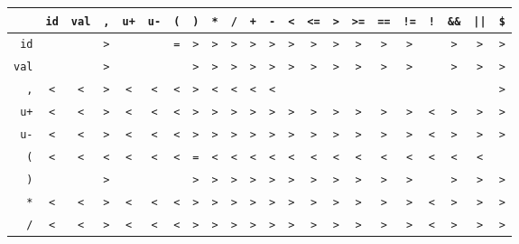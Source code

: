 \documentclass[11pt,a4paper]{article}
\newcommand*\id[1]{\texttt{#1}}
\begin{document}
  \begin{table}[H]
    \centering
    \begin{tabular}{|r||c|c|c|c|c|c|c|c|c|c|c|c|c|c|c|c|c|c|c|c|c|}
      \hline
               & \id{id} & \id{val} & \id{,} & \id{u+} & \id{u-} & \id{(} & \id{)} & \id{*} & \id{/} & \id{+} & \id{-} & \id{<} & \id{<=} & \id{>} & \id{>=} & \id{==} & \id{!=} & \id{!} & \id{\&\&} & \id{||} & \id{\$} \\ \hline
      \hline
      \id{id}  & \id{ }  & \id{ }   & \id{>} & \id{ }  & \id{ }  & \id{=} & \id{>} & \id{>} & \id{>} & \id{>} & \id{>} & \id{>} & \id{>}  & \id{>} & \id{>}  & \id{>}  & \id{>}  & \id{ } & \id{>} & \id{>} & \id{>}  \\ \hline
      \id{val} & \id{ }  & \id{ }   & \id{>} & \id{ }  & \id{ }  & \id{ } & \id{>} & \id{>} & \id{>} & \id{>} & \id{>} & \id{>} & \id{>}  & \id{>} & \id{>}  & \id{>}  & \id{>}  & \id{ } & \id{>} & \id{>} & \id{>}  \\ \hline
      \id{,}   & \id{<}  & \id{<}   & \id{>} & \id{<}  & \id{<}  & \id{<} & \id{>} & \id{<} & \id{<} & \id{<} & \id{<} & \id{ } & \id{ }  & \id{ } & \id{ }  & \id{ }  & \id{ }  & \id{ } & \id{ } & \id{ } & \id{>}  \\ \hline
      \id{u+}  & \id{<}  & \id{<}   & \id{>} & \id{<}  & \id{<}  & \id{<} & \id{>} & \id{>} & \id{>} & \id{>} & \id{>} & \id{>} & \id{>}  & \id{>} & \id{>}  & \id{>}  & \id{>}  & \id{<} & \id{>} & \id{>} & \id{>}  \\ \hline
      \id{u-}  & \id{<}  & \id{<}   & \id{>} & \id{<}  & \id{<}  & \id{<} & \id{>} & \id{>} & \id{>} & \id{>} & \id{>} & \id{>} & \id{>}  & \id{>} & \id{>}  & \id{>}  & \id{>}  & \id{<} & \id{>} & \id{>} & \id{>}  \\ \hline
      \id{(}   & \id{<}  & \id{<}   & \id{<} & \id{<}  & \id{<}  & \id{<} & \id{=} & \id{<} & \id{<} & \id{<} & \id{<} & \id{<} & \id{<}  & \id{<} & \id{<}  & \id{<}  & \id{<}  & \id{<} & \id{<} & \id{<} & \id{ }  \\ \hline
      \id{)}   & \id{ }  & \id{ }   & \id{>} & \id{ }  & \id{ }  & \id{ } & \id{>} & \id{>} & \id{>} & \id{>} & \id{>} & \id{>} & \id{>}  & \id{>} & \id{>}  & \id{>}  & \id{>}  & \id{ } & \id{>} & \id{>} & \id{>}  \\ \hline

      \id{*}   & \id{<}  & \id{<}   & \id{>} & \id{<}  & \id{<}  & \id{<} & \id{>} & \id{>} & \id{>} & \id{>} & \id{>} & \id{>} & \id{>}  & \id{>} & \id{>}  & \id{>}  & \id{>}  & \id{<} & \id{>} & \id{>} & \id{>}  \\ \hline
      \id{/}   & \id{<}  & \id{<}   & \id{>} & \id{<}  & \id{<}  & \id{<} & \id{>} & \id{>} & \id{>} & \id{>} & \id{>} & \id{>} & \id{>}  & \id{>} & \id{>}  & \id{>}  & \id{>}  & \id{<} & \id{>} & \id{>} & \id{>}  \\ \hline


\end{tabular}
\end{table}
\end{document}
